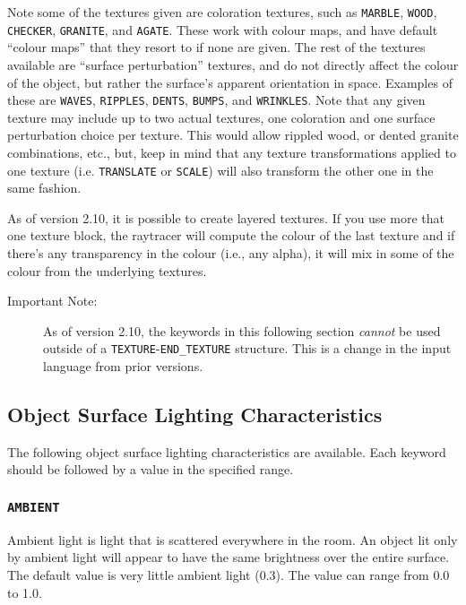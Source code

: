 Note some of the textures given are coloration textures, such as
{\tt MARBLE}, {\tt WOOD}, {\tt CHECKER}, {\tt GRANITE}, and {\tt AGATE}.
These work with colour maps, and have
default ``colour maps'' that
they resort to if none are given.  The rest of the textures available
are ``surface perturbation'' textures, and do not directly affect the
colour of the object, but rather the surface's apparent orientation in
space.  Examples of these are {\tt WAVES}, {\tt RIPPLES}, {\tt DENTS},
{\tt BUMPS}, and {\tt WRINKLES}.  Note that
any given texture may
include up to two actual textures, one coloration and one surface
perturbation choice per texture.  This would allow rippled wood, or
dented granite combinations, etc., but, keep in mind that any texture
transformations applied to one texture (i.e. {\tt TRANSLATE} or
{\tt SCALE}) will also transform the other one in the same fashion.

As of version 2.10, it is possible to create layered
textures. If you use more
that one texture block, the raytracer will compute the colour of the last
texture and if there's any transparency in the colour (i.e., any alpha), it
will mix in some of the colour from the underlying
textures.

\begin{description}
\item[Important Note:] As of version 2.10, the keywords in this
following section {\em cannot} be used outside of a
{\tt TEXTURE}-{\tt END_TEXTURE} structure. This is a change in the
input language from prior versions.
\end{description}

\subsection{Object Surface Lighting Characteristics}

The following object surface lighting characteristics are available.
Each keyword should be followed by a value in the specified range.

\subsubsection{{\tt AMBIENT}}

Ambient light is light that is scattered everywhere in the room.  An object
lit only by ambient light will appear to have the same brightness over the
entire surface.  The default value is very little ambient light (0.3).  The
value can range from 0.0 to 1.0. 

